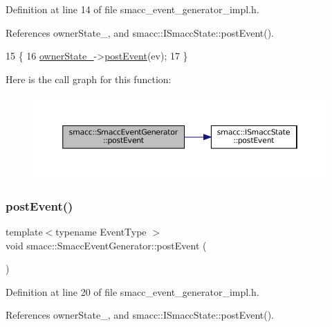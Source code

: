 Definition at line 14 of file smacc\+\_\+event\+\_\+generator\+\_\+impl.\+h.



References owner\+State\+\_\+, and smacc\+::\+I\+Smacc\+State\+::post\+Event().


\begin{DoxyCode}
15     \{
16         \hyperlink{classsmacc_1_1SmaccEventGenerator_ac7efdd1d9c69906c3a9d3f66e13bb04a}{ownerState\_}->\hyperlink{classsmacc_1_1ISmaccState_acef404ab3766ddf2892e8dad14a4a7cf}{postEvent}(ev);
17     \}
\end{DoxyCode}
Here is the call graph for this function\+:
\nopagebreak
\begin{figure}[H]
\begin{center}
\leavevmode
\includegraphics[width=350pt]{classsmacc_1_1SmaccEventGenerator_a0bc8c90df39c07d36f74e3dd60ad5c8d_cgraph}
\end{center}
\end{figure}
\mbox{\label{classsmacc_1_1SmaccEventGenerator_a9c1df7c3e6b5ff7bf0da8f6d24fab4bb}} 
\subsubsection{\texorpdfstring{post\+Event()}{postEvent()}\hspace{0.1cm}{\footnotesize\ttfamily [2/2]}}
{\footnotesize\ttfamily template$<$typename Event\+Type $>$ \\
void smacc\+::\+Smacc\+Event\+Generator\+::post\+Event (\begin{DoxyParamCaption}{ }\end{DoxyParamCaption})}



Definition at line 20 of file smacc\+\_\+event\+\_\+generator\+\_\+impl.\+h.



References owner\+State\+\_\+, and smacc\+::\+I\+Smacc\+State\+::post\+Event().


